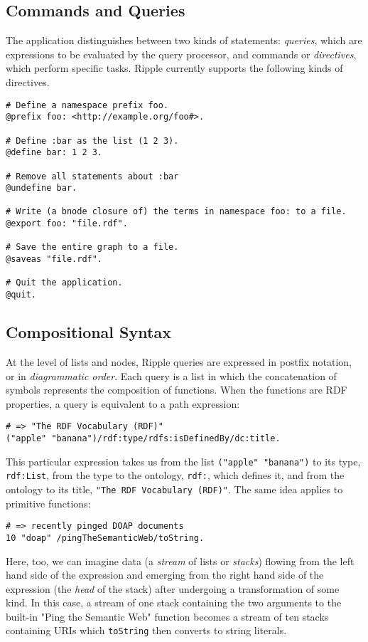 \documentclass[runningheads]{llncs}
\begin{document}
\subsection{Commands and Queries}
The application distinguishes between two kinds of statements: \textit{queries}, which are expressions to be evaluated by the query processor, and commands or \textit{directives}, which perform specific tasks.  Ripple currently supports the following kinds of directives.
\newline
\begin{verbatim}
# Define a namespace prefix foo.
@prefix foo: <http://example.org/foo#>.

# Define :bar as the list (1 2 3).
@define bar: 1 2 3.

# Remove all statements about :bar
@undefine bar.

# Write (a bnode closure of) the terms in namespace foo: to a file.
@export foo: "file.rdf".

# Save the entire graph to a file.
@saveas "file.rdf".

# Quit the application.
@quit.
\end{verbatim}


\subsection{Compositional Syntax}
At the level of lists and nodes, Ripple queries are expressed in postfix notation, or in \textit{diagrammatic order}.  Each query is a list in which the concatenation of symbols represents the composition of functions.  When the functions are RDF properties, a query is equivalent to a path expression:
\begin{verbatim}
# => "The RDF Vocabulary (RDF)"
("apple" "banana")/rdf:type/rdfs:isDefinedBy/dc:title.
\end{verbatim}

This particular expression takes us from the list \texttt{("apple" "banana")} to its type, \texttt{rdf:List}, from the type to the ontology, \texttt{rdf:}, which defines it, and from the ontology to its title, \texttt{"The RDF Vocabulary (RDF)"}.  The same idea applies to primitive functions:
\begin{verbatim}
# => recently pinged DOAP documents
10 "doap" /pingTheSemanticWeb/toString.
\end{verbatim}

Here, too, we can imagine data (a \textit{stream} of lists or \textit{stacks}) flowing from the left hand side of the expression and emerging from the right hand side of the expression (the \textit{head} of the stack) after undergoing a transformation of some kind.  In this case, a stream of one stack containing the two arguments to the built-in "Ping the Semantic Web" function becomes a stream of ten stacks containing URIs which \texttt{toString} then converts to string literals.
\end{document}
